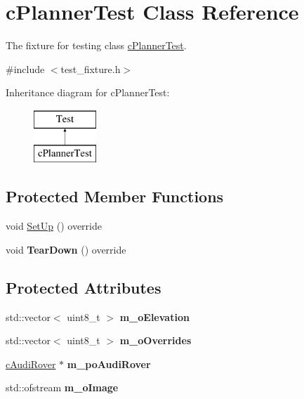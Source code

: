 \hypertarget{classc_planner_test}{}\section{c\+Planner\+Test Class Reference}
\label{classc_planner_test}


The fixture for testing class \mbox{\hyperlink{classc_planner_test}{c\+Planner\+Test}}.  




{\ttfamily \#include $<$test\+\_\+fixture.\+h$>$}

Inheritance diagram for c\+Planner\+Test\+:\begin{figure}[H]
\begin{center}
\leavevmode
\includegraphics[height=2.000000cm]{classc_planner_test}
\end{center}
\end{figure}
\subsection*{Protected Member Functions}
\begin{DoxyCompactItemize}
\item 
void \mbox{\hyperlink{classc_planner_test_a88ad8b0e63c66a9d94c7606aa67ef20d}{Set\+Up}} () override
\item 
\mbox{\label{classc_planner_test_ae7db6ebf867e3ba6bf8adaaca636f064}} 
void {\bfseries Tear\+Down} () override
\end{DoxyCompactItemize}
\subsection*{Protected Attributes}
\begin{DoxyCompactItemize}
\item 
\mbox{\label{classc_planner_test_a2c260d30f0f5371416fe6c1824b1384b}} 
std\+::vector$<$ uint8\+\_\+t $>$ {\bfseries m\+\_\+o\+Elevation}
\item 
\mbox{\label{classc_planner_test_ad4e56282ffdb60b6b671d94ee7040f98}} 
std\+::vector$<$ uint8\+\_\+t $>$ {\bfseries m\+\_\+o\+Overrides}
\item 
\mbox{\label{classc_planner_test_a11bbf6211d730c131edc4e8fdabd625a}} 
\mbox{\hyperlink{classplanner_1_1c_audi_rover}{c\+Audi\+Rover}} $\ast$ {\bfseries m\+\_\+po\+Audi\+Rover}
\item 
\mbox{\label{classc_planner_test_a0055de157965367e44964a714c216c77}} 
std\+::ofstream {\bfseries m\+\_\+o\+Image}
\end{DoxyCompactItemize}



